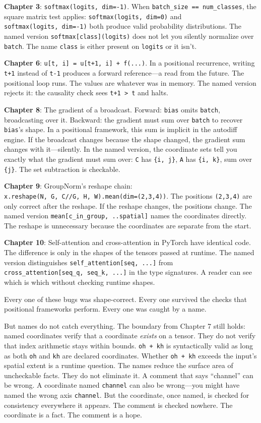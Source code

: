 \documentclass[11pt,titlepage]{article}
\begin{document}
\textbf{Chapter 3}: \texttt{softmax(logits,\ dim=-1)}. When
\texttt{batch\_size\ ==\ num\_classes}, the square matrix test applies:
\texttt{softmax(logits,\ dim=0)} and \texttt{softmax(logits,\ dim=-1)}
both produce valid probability distributions. The named version
\texttt{softmax{[}class{]}(logits)} does not let you silently normalize
over \texttt{batch}. The name \texttt{class} is either present on
\texttt{logits} or it isn't.

\textbf{Chapter 6}: \texttt{u{[}t,\ i{]}\ =\ u{[}t+1,\ i{]}\ +\ f(...)}.
In a positional recurrence, writing \texttt{t+1} instead of \texttt{t-1}
produces a forward reference---a read from the future. The positional
loop runs. The values are whatever was in memory. The named version
rejects it: the causality check sees \texttt{t+1\ \textgreater{}\ t} and
halts.

\textbf{Chapter 8}: The gradient of a broadcast. Forward: \texttt{bias}
omits \texttt{batch}, broadcasting over it. Backward: the gradient must
sum over \texttt{batch} to recover \texttt{bias}'s shape. In a
positional framework, this sum is implicit in the autodiff engine. If
the broadcast changes because the shape changed, the gradient sum
changes with it---silently. In the named version, the coordinate sets
tell you exactly what the gradient must sum over: \texttt{C} has
\texttt{\{i,\ j\}}, \texttt{A} has \texttt{\{i,\ k\}}, sum over
\texttt{\{j\}}. The set subtraction is checkable.

\textbf{Chapter 9}: GroupNorm's reshape chain:
\texttt{x.reshape(N,\ G,\ C//G,\ H,\ W).mean(dim=(2,3,4))}. The
positions \texttt{(2,3,4)} are only correct after the reshape. If the
reshape changes, the positions change. The named version
\texttt{mean{[}c\_in\_group,\ ..spatial{]}} names the coordinates
directly. The reshape is unnecessary because the coordinates are
separate from the start.

\textbf{Chapter 10}: Self-attention and cross-attention in PyTorch have
identical code. The difference is only in the shapes of the tensors
passed at runtime. The named version distinguishes
\texttt{self\_attention{[}seq,\ ...{]}} from
\texttt{cross\_attention{[}seq\_q,\ seq\_k,\ ...{]}} in the type
signatures. A reader can see which is which without checking runtime
shapes.

Every one of these bugs was shape-correct. Every one survived the checks
that positional frameworks perform. Every one was caught by a name.

But names do not catch everything. The boundary from Chapter 7 still
holds: named coordinates verify that a coordinate \emph{exists} on a
tensor. They do not verify that index arithmetic stays within bounds.
\texttt{oh\ +\ kh} is syntactically valid as long as both \texttt{oh}
and \texttt{kh} are declared coordinates. Whether \texttt{oh\ +\ kh}
exceeds the input's spatial extent is a runtime question. The names
reduce the surface area of uncheckable facts. They do not eliminate it.
A comment that says ``channel'' can be wrong. A coordinate named
\texttt{channel} can also be wrong---you might have named the wrong axis
\texttt{channel}. But the coordinate, once named, is checked for
consistency everywhere it appears. The comment is checked nowhere. The
coordinate is a fact. The comment is a hope.
\end{document}
